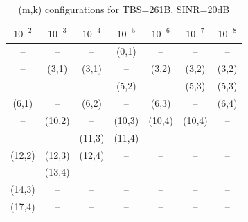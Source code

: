 \begin{table}[ht]
\centering
\caption{(m,k) configurations for TBS=261B, SINR=20dB}
\label{tab:conf_{261B_20dB}}
\begin{tabular}{ccccccc}
\hline
$10^{-2}$ & $10^{-3}$ & $10^{-4}$ & $10^{-5}$ & $10^{-6}$ & $10^{-7}$ & $10^{-8}$ \\ \hline
-- & -- & -- & (0,1) & -- & -- & -- \\
-- & (3,1) & (3,1) & -- & (3,2) & (3,2) & (3,2) \\
-- & -- & -- & (5,2) & -- & (5,3) & (5,3) \\
(6,1) & -- & (6,2) & -- & (6,3) & -- & (6,4) \\
-- & (10,2) & -- & (10,3) & (10,4) & (10,4) & -- \\
-- & -- & (11,3) & (11,4) & -- & -- & -- \\
(12,2) & (12,3) & (12,4) & -- & -- & -- & -- \\
-- & (13,4) & -- & -- & -- & -- & -- \\
(14,3) & -- & -- & -- & -- & -- & -- \\
(17,4) & -- & -- & -- & -- & -- & -- \\
\hline
\end{tabular}
\end{table}